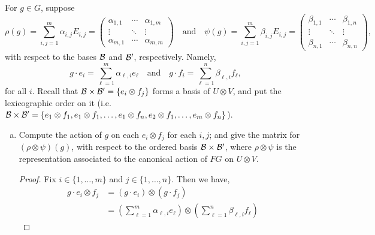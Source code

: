 \documentclass[11pt, reqno]{amsart}
\theoremstyle{plain}
\theoremstyle{definition}
\theoremstyle{example}
\begin{document}
\begin{enumerate}[I ]
\begin{enumerate}[1.]
For $g \in G$, suppose 
$$\rho(g) = \sum_{i,j=1}^m \alpha_{i,j}E_{i,j}  = 
	\begin{pmatrix} 
			\alpha_{1,1} & \cdots & \alpha_{1,m} \\ 
			\vdots & \ddots& \vdots \\
			\alpha_{m,1} & \cdots & \alpha_{m,m} \end{pmatrix} \quad \text{and} \quad 
	\psi(g) = \sum_{i,j=1}^m \beta_{i,j}E_{i,j}  = 
	\begin{pmatrix} 
			\beta_{1,1} & \cdots & \beta_{1,n} \\ 
			\vdots & \ddots& \vdots \\
			\beta_{n,1} & \cdots & \beta_{n,n} \end{pmatrix},$$
with respect to the bases $\mathcal{B}$ and $\mathcal{B}'$, respectively. Namely, 
$$g \cdot e_i = \sum_{\ell=1}^m \alpha_{\ell,i}e_\ell \quad \text{and} \quad g \cdot f_i = \sum_{\ell=1}^n \beta_{\ell,i}f_\ell,$$
for all $i$. Recall that $\mathcal{B} \times \mathcal{B}' = \{e_i \otimes f_j\}$ forms a basis of $U \otimes V$, and put the lexicographic order on it (i.e.\ $\mathcal{B} \times \mathcal{B}' = \{e_1 \otimes f_1, e_1 \otimes f_1, \dots, e_1\otimes f_n, e_2 \otimes f_1, \dots, e_m \otimes f_n\}$).
\begin{enumerate}[(a)]
\item Compute the action of $g$ on each $e_i \otimes f_j$ for each $i,j$; and give the matrix for $(\rho \otimes \psi)(g)$, with respect to the ordered basis $\mathcal{B} \times \mathcal{B}'$, where $\rho \otimes \psi$ is the representation associated to the canonical action of $FG$ on $U \otimes V$.

\begin{proof}
Fix $i \in \{1, \ldots, m\}$ and $j \in \{1, \ldots, n\}$. Then we have,
\begin{align*}
g \cdot e_i \otimes f_j &= (g \cdot e_i) \otimes (g \cdot f_j)\\
&= \left(\sum_{\ell=1}^m \alpha_{\ell,i}e_\ell \right) \otimes \left( \sum_{\ell=1}^n \beta_{\ell,i}f_\ell \right)
\end{align*}


\end{proof}
\end{enumerate}
\end{enumerate}
\end{enumerate}
\end{document}
